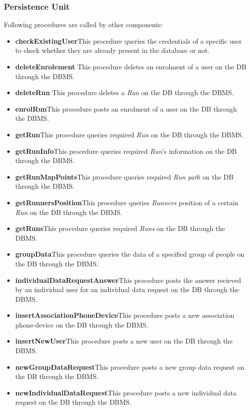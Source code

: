 \subsubsection{Persistence Unit}
Following procedures are called by other components:
\begin{itemize}
  \item \textbf{checkExistingUser}\quad This procedure queries the credentials of a specific user to check whether they are already present in the database or not.
  \item \textbf{deleteEnrolement} \quad This procedure deletes an enrolment of a user on the DB through the DBMS.
  \item \textbf{deleteRun} \quad This procedure deletes a \textit{Run} on the DB through the DBMS.
  \item \textbf{enrolRun}\quad This procedure posts an enrolment of a user on the DB through the DBMS.
  \item \textbf{getRun}\quad This procedure queries required \textit{Run} on the DB through the DBMS.
  \item \textbf{getRunInfo}\quad This procedure queries required \textit{Run}'s information on the DB through the DBMS.
  \item \textbf{getRunMapPoints}\quad This procedure queries required \textit{Run path} on the DB through the DBMS.
  \item \textbf{getRunnersPosition}\quad This procedure queries \textit{Runners} position of a certain \textit{Run} on the DB through the DBMS.
  \item \textbf{getRuns}\quad This procedure queries required \textit{Runs} on the DB through the DBMS.
  \item \textbf{groupData}\quad This procedure queries the data of a specified group of people on the DB through the DBMS.
  \item \textbf{individualDataRequestAnswer}\quad This procedure posts the answer recieved by an individual user for an individual data request on the DB through the DBMS.
  \item \textbf{insertAssociationPhoneDevice}\quad This procedure posts a new association phone-device on the DB through the DBMS.
  \item \textbf{insertNewUser}\quad This procedure posts a new user on the DB through the DBMS.
  \item \textbf{newGroupDataRequest}\quad This procedure posts a new group data request on the DB through the DBMS.
  \item \textbf{newIndividualDataRequest}\quad This procedure posts a new individual data request on the DB through the DBMS.

\end{itemize}
